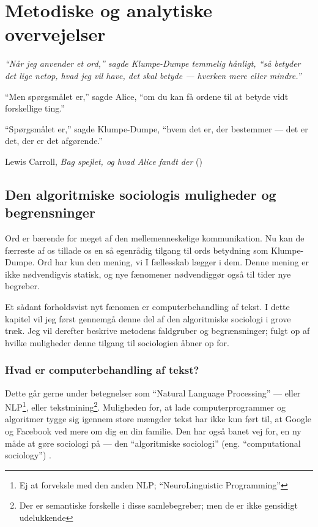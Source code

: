 \part{Metodiske og analytiske overvejelser}\label{part:method}

\epigraph{\itshape
“Når jeg anvender et ord,” sagde Klumpe-Dumpe temmelig hånligt, “så betyder det lige netop, hvad jeg vil have, det skal betyde — hverken mere eller mindre.”

“Men spørgsmålet er,” sagde Alice, “om du kan få ordene til at betyde vidt forskellige ting.”

“Spørgsmålet er,” sagde Klumpe-Dumpe, “hvem det er, der bestemmer — det er det, der er det afgørende.”
}{Lewis Carroll, \textit{Bag spejlet, og hvad Alice fandt der} (\citeyear{carrollAliceEventyrlandOg1977})}

\chapter{Den algoritmiske sociologis muligheder og begrensninger}

Ord er bærende for meget af den mellemenneskelige kommunikation.
Nu kan de færreste af os tillade os en så egenrådig tilgang til ords betydning som Klumpe-Dumpe.
Ord har kun den mening, vi I fællesskab lægger i dem.
Denne mening er ikke nødvendigvis statisk, og nye fænomener nødvendiggør også til tider nye begreber.

Et sådant forholdsvist nyt fænomen er computerbehandling af tekst.
I dette kapitel vil jeg først gennemgå denne del af den algoritmiske sociologi i grove træk.
Jeg vil derefter beskrive metodens faldgruber og begrænsninger; fulgt op af hvilke muligheder denne tilgang til sociologien åbner op for.

\section{Hvad er computerbehandling af tekst?}

Dette går gerne under betegnelser som “Natural Language Processing” — eller NLP\footnote{Ej at forveksle med den anden NLP; “NeuroLinguistic Programming”}, eller tekstmining\footnote{Der er semantiske forskelle i disse samlebegreber; men de er ikke gensidigt udelukkende}.
Muligheden for, at lade computerprogrammer og algoritmer tygge sig igennem store mængder tekst har ikke kun ført til, at Google og Facebook ved mere om dig en din familie.
Den har også banet vej for, en ny måde at gøre sociologi på — den “algoritmiske sociologi” (eng. “computational sociology”) \autocite{evansComputationSociologicalImagination2019}.

